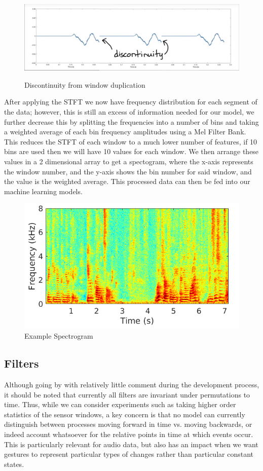 \documentclass{article}
\begin{document}
\begin{figure}[h]
    \centering
    \caption{Discontinuity from window duplication}
    \includegraphics[width=0.5\linewidth]{discontinuity example.png}
    \label{fig:discon}
\end{figure}

After applying the STFT we now have frequency distribution for each segment of the data; however, this is still an excess of information needed for our model, we further decrease this by splitting the frequencies into a number of bins and taking a weighted average of each bin frequency amplitudes using a Mel Filter Bank. This reduces the STFT of each window to a much lower number of features, if 10 bins are used then we will have 10 values for each window. We then arrange these values in a 2 dimensional array to get a spectogram, where the x-axis represents the window number, and the y-axis shows the bin number for said window, and the value is the weighted average. This processed data can then be fed into our machine learning models. \\

\begin{figure}[h]
    \centering
    \caption{Example Spectrogram}
    \includegraphics[width=0.5\linewidth]{example_spectrogram.png}
\end{figure}

\subsection{Filters}%
\label{subsec:filters}

Although going by with relatively little comment during the development process, it should be noted that currently all filters are invariant under permutations to time. Thus, while we can consider experiments such as taking higher order statistics of the sensor windows, a key concern is that no model can currently distinguish between processes moving forward in time vs. moving backwards, or indeed account whatsoever for the relative points in time at which events occur. This is particularly relevant for audio data, but also has an impact when we want gestures to represent particular types of changes rather than particular constant states. \\
\end{document}

